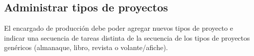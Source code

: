 \documentclass[a4paper, 12pt,twoside]{report}  %
\numberwithin{equation}{subsection} %
\begin{document}
\indent
\\\\\\\\\\\\\\\\
\pagebreak

\subsection*{Administrar tipos de proyectos}
El encargado de producción debe poder agregar nuevos tipos de proyecto e indicar una secuencia de tareas distinta de la secuencia de los tipos de proyectos genéricos (almanaque, libro, revista o volante/afiche).

\renewcommand{\arraystretch}{1.4}
\end{document}
